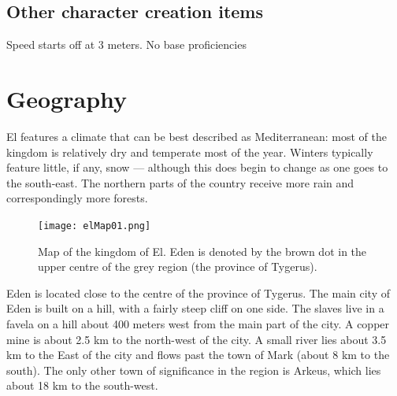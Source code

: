 \documentclass[letterpaper,12pt]{article}
\begin{document}
\subsection{Other character creation items}

Speed starts off at 3 meters. No base proficiencies 

\section{Geography}\label{Geography}

El features a climate that can be best described as Mediterranean: most of the kingdom is relatively dry and temperate most of the year. Winters typically feature little, if any, snow --- although this does begin to change as one goes to the south-east. The northern parts of the country receive more rain and correspondingly more forests.  

\begin{figure}[ht] 
        \centering \texttt{[image: elMap01.png]}
        \caption{Map of the kingdom of El. Eden is denoted by the brown dot in the upper centre of the grey region (the province of Tygerus).}
\end{figure}

Eden is located close to the centre of the province of Tygerus. The main city of Eden is built on a hill, with a fairly steep cliff on one side. The slaves live in a favela on a hill about 400 meters west from the main part of the city. A copper mine is about 2.5 km to the north-west of the city. A small river lies about 3.5 km to the East of the city and flows past the town of Mark (about 8 km to the south). The only other town of significance in the region is Arkeus, which lies about 18 km to the south-west. 
\end{document}
